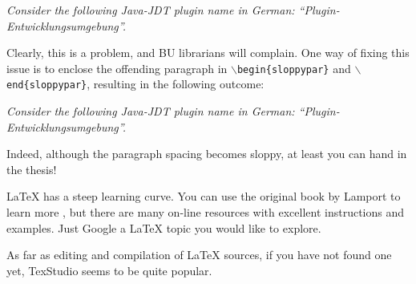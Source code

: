 \bigskip 

{\it Consider the following Java-JDT plugin name in German: "`Plugin-Entwicklungsumgebung"'.
}

\bigskip

Clearly, this is a problem, and BU librarians will complain.
One way of fixing this issue is to enclose the offending paragraph in {\tt $\backslash$begin\{sloppypar\}} and {\tt $\backslash$end\{sloppypar\}}, resulting in the following outcome: 

\bigskip 

\begin{sloppypar} {\it Consider the following Java-JDT plugin name in German: "`Plugin-Entwicklungsumgebung"'.
	}
\end{sloppypar}

\bigskip

Indeed, although the paragraph spacing becomes sloppy, at least you can hand in the thesis!

LaTeX has a steep learning curve.
You can use the original book by Lamport to learn more \cite{lamport1985:latex}, but there are many on-line resources with excellent instructions and examples.
Just Google a LaTeX topic you would like to explore.

As far as editing and compilation of LaTeX sources, if you have not found one yet, TexStudio seems to be quite popular.